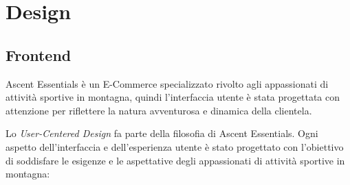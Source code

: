 \chapter{Design}

\section{Frontend}



Ascent Essentials è un E-Commerce specializzato rivolto agli appassionati di attività sportive in montagna, quindi l'interfaccia utente è stata progettata con attenzione per riflettere la natura avventurosa e dinamica della clientela.

Lo \textit{User-Centered Design} fa parte della filosofia di Ascent Essentials. Ogni aspetto dell'interfaccia e dell'esperienza utente è stato progettato con l'obiettivo di soddisfare le esigenze e le aspettative degli appassionati di attività sportive in montagna:


